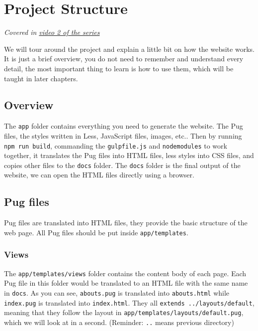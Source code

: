 \chapter{Project Structure}
\label{sec:projstructure}

\textit{Covered in \href{https://www.youtube.com/watch?v=fbbjnhs4nyo&list=PLjGmdnqrOKuYXiu7lgG5HW71jPEUd1XCm&index=3}{video 2 of the series}}
\vspace{6mm}

We will tour around the project and explain a little bit on how the website works. It is just a brief overview, you do not need to remember and understand every detail, the most important thing to learn is how to use them, which will be taught in later chapters.

\section{Overview}

The \texttt{app} folder contains everything you need to generate the website. The Pug files, the styles written in Less, JavaScript files, images, etc.. Then by running \texttt{npm run build}, commanding the \texttt{gulpfile.js} and \texttt{node\textunderscore modules} to work together, it translates the Pug files into HTML files, less styles into CSS files, and copies other files to the \texttt{docs} folder. The \texttt{docs} folder is the final output of the website, we can open the HTML files directly using a browser.

\section{Pug files}

Pug files are translated into HTML files, they provide the basic structure of the web page. All Pug files should be put inside \texttt{app/templates}.

\subsection*{Views}

The \texttt{app/templates/views} folder contains the content body of each page. Each Pug file in this folder would be translated to an HTML file with the same name in \texttt{docs}. As you can see, \texttt{abouts.pug} is translated into \texttt{abouts.html} while \texttt{index.pug} is translated into \texttt{index.html}. They all \texttt{extends ../layouts/default}, meaning that they follow the layout in \texttt{app/templates/layouts/default.pug}, which we will look at in a second. (Reminder: \texttt{..} means previous directory)

